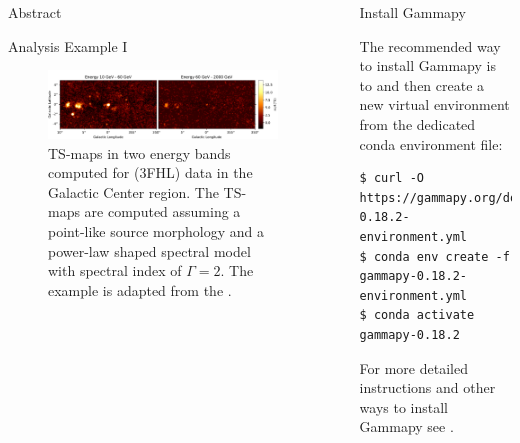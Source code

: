 \documentclass[
    final,
    ]{beamer}
\newlength{\sepwidth}
\newlength{\colwidth}
\newcommand{\separatorcolumn}{\begin{column}{\sepwidth}\end{column}}
\newcommand{\coloredhref}[3][blue]{\href{#2}{\color{#1}{#3}}}%
\begin{document}
\begin{frame}[t, fragile]
\begin{columns}[t]
\begin{column}{\colwidth}
\begin{block}{Abstract}
  \end{block}

  \begin{block}{Analysis Example I}
    \begin{figure}
      \centering
      \includegraphics[width=\textwidth]{figures/fermi-gc-sqrt-ts.pdf}
      \caption{TS-maps in two energy bands computed for \coloredhref[pink]{https://fermi.gsfc.nasa.gov}{Fermi-LAT} (3FHL) data in the Galactic Center region. The TS-maps are computed assuming a point-like source morphology and a power-law shaped spectral model with spectral index of $\Gamma = 2$. The example is adapted from the \coloredhref[pink]{https://docs.gammapy.org/0.18.2/tutorials/detect.html}{source detection tutorial}.}
    \end{figure}
 
  \end{block}

\end{column}

\separatorcolumn

\begin{column}{\colwidth}

  \begin{alertblock}{Install Gammapy}

    The recommended way to install Gammapy is to \coloredhref[pink]{https://www.anaconda.com/products/individual}{download the Anaconda Python distribution} and then create a new virtual environment
    from the dedicated conda environment file:
%
    \begin{verbatim}
$ curl -O https://gammapy.org/download/install/gammapy-0.18.2-environment.yml
$ conda env create -f gammapy-0.18.2-environment.yml
$ conda activate gammapy-0.18.2
    \end{verbatim}
%
    \vspace{-24pt} 
    For more detailed instructions and other ways to install Gammapy see \coloredhref[pink]{https://docs.gammapy.org/0.18.2/install/index.html}{installation instructions}.
  \end{alertblock}


\end{column}
\end{columns}
\end{frame}
\end{document}
